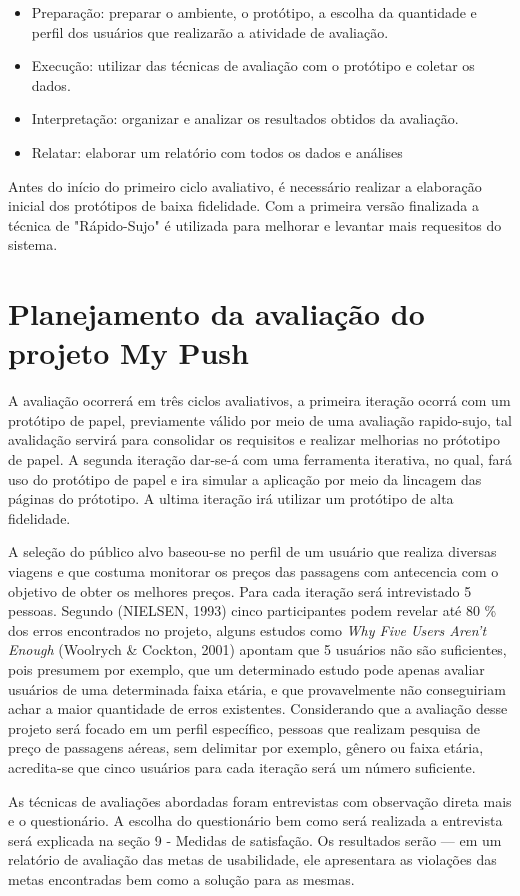 \begin{itemize}
	\item Preparação: preparar o ambiente, o protótipo, a escolha da quantidade e perfil dos usuários que realizarão a atividade de avaliação.
	\item Execução: utilizar das técnicas de avaliação com o protótipo e coletar os dados.
	\item Interpretação: organizar e analizar os resultados obtidos da avaliação.
	\item Relatar: elaborar um relatório com todos os dados e análises
\end{itemize}

Antes do início do primeiro ciclo avaliativo, é necessário realizar a elaboração inicial dos protótipos de baixa fidelidade. Com a primeira versão finalizada a técnica de "Rápido-Sujo" é utilizada para melhorar e levantar mais requesitos do sistema.

\section{Planejamento da avaliação do projeto My Push}

A avaliação ocorrerá em três ciclos avaliativos, a primeira iteração ocorrá com um protótipo de papel, previamente válido por meio de uma avaliação rapido-sujo, tal avalidação servirá para consolidar os requisitos e realizar melhorias no prótotipo de papel. A segunda iteração dar-se-á com uma ferramenta iterativa, no qual, fará uso do protótipo de papel e ira simular a aplicação por meio da lincagem das páginas do prótotipo. A ultima iteração irá utilizar um protótipo de alta fidelidade.

A seleção do público alvo baseou-se no perfil de um usuário que realiza diversas viagens e que costuma monitorar os preços das passagens com antecencia com o objetivo de obter os melhores preços. Para cada iteração será intrevistado 5 pessoas. Segundo (NIELSEN, 1993) cinco participantes podem revelar até 80 \% dos erros encontrados no projeto, alguns estudos como \textit{Why Five Users Aren't Enough} (Woolrych & Cockton, 2001) apontam que 5 usuários não são suficientes, pois presumem por exemplo, que um determinado estudo pode apenas avaliar usuários de uma determinada faixa etária, e que provavelmente não conseguiriam achar a maior quantidade de erros existentes. Considerando que a avaliação desse projeto será focado em um perfil específico, pessoas que realizam pesquisa de preço de passagens aéreas, sem delimitar por exemplo, gênero ou faixa etária, acredita-se que cinco usuários para cada iteração será um número suficiente.

As técnicas de avaliações abordadas foram entrevistas com observação direta mais e o questionário. A escolha do questionário bem como será realizada a entrevista será explicada na seção 9 - Medidas de satisfação. Os resultados serão --- em um relatório de avaliação das metas de usabilidade, ele apresentara as violações das metas encontradas bem como a solução para as mesmas. 
